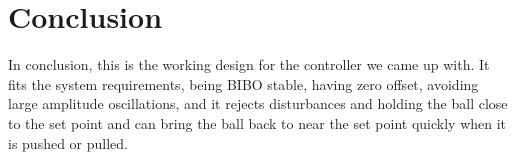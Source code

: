 \section*{Conclusion}
In conclusion, this is the working design for the controller we came up with. It fits the system requirements, being BIBO stable, having zero offset, avoiding large amplitude oscillations, and it rejects disturbances and holding the ball close to the set point and can bring the ball back to near the set point quickly when it is pushed or pulled.